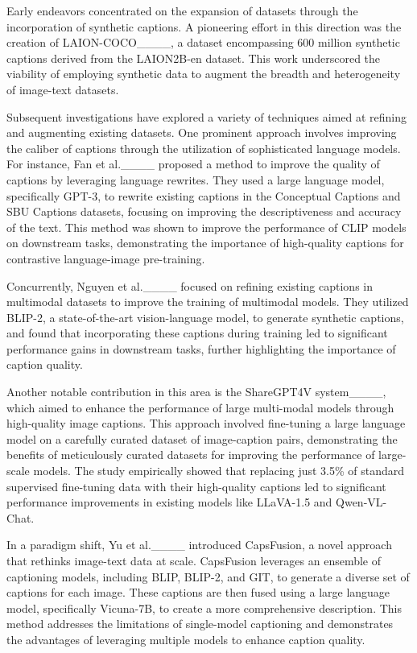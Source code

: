 Early endeavors concentrated on the expansion of datasets through the incorporation of synthetic captions. A pioneering effort in this direction was the creation of LAION-COCO____, a dataset encompassing 600 million synthetic captions derived from the LAION2B-en dataset. This work underscored the viability of employing synthetic data to augment the breadth and heterogeneity of image-text datasets.

Subsequent investigations have explored a variety of techniques aimed at refining and augmenting existing datasets. One prominent approach involves improving the caliber of captions through the utilization of sophisticated language models. For instance, Fan et al.____ proposed a method to improve the quality of captions by leveraging language rewrites. They used a large language model, specifically GPT-3, to rewrite existing captions in the Conceptual Captions and SBU Captions datasets, focusing on improving the descriptiveness and accuracy of the text. This method was shown to improve the performance of CLIP models on downstream tasks, demonstrating the importance of high-quality captions for contrastive language-image pre-training.

Concurrently, Nguyen et al.____ focused on refining existing captions in multimodal datasets to improve the training of multimodal models. They utilized BLIP-2, a state-of-the-art vision-language model, to generate synthetic captions, and found that incorporating these captions during training led to significant performance gains in downstream tasks, further highlighting the importance of caption quality.

Another notable contribution in this area is the ShareGPT4V system____, which aimed to enhance the performance of large multi-modal models through high-quality image captions. This approach involved fine-tuning a large language model on a carefully curated dataset of image-caption pairs, demonstrating the benefits of meticulously curated datasets for improving the performance of large-scale models. The study empirically showed that replacing just 3.5\% of standard supervised fine-tuning data with their high-quality captions led to significant performance improvements in existing models like LLaVA-1.5 and Qwen-VL-Chat.

In a paradigm shift, Yu et al.____ introduced CapsFusion, a novel approach that rethinks image-text data at scale. CapsFusion leverages an ensemble of captioning models, including BLIP, BLIP-2, and GIT, to generate a diverse set of captions for each image. These captions are then fused using a large language model, specifically Vicuna-7B, to create a more comprehensive description. This method addresses the limitations of single-model captioning and demonstrates the advantages of leveraging multiple models to enhance caption quality.

